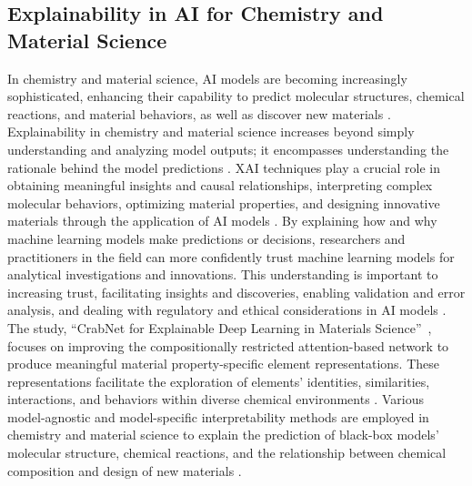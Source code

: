 \documentclass[final,5p,times,twocolumn]{elsarticle}
\begin{document}
\subsection{Explainability in AI for Chemistry and Material Science}
In chemistry and material science, AI models are becoming increasingly sophisticated, enhancing their capability to predict molecular structures, chemical reactions, and material behaviors, as well as discover new materials \cite{maqsood2024future}. Explainability in chemistry and material science increases beyond simply understanding and analyzing model outputs; it encompasses understanding the rationale behind the model predictions \cite{oviedo2022interpretable}. XAI techniques play a crucial role in obtaining meaningful insights and causal relationships, interpreting complex molecular behaviors, optimizing material properties, and designing innovative materials through the application of AI models \cite{pilania2021machine}. By explaining how and why machine learning models make predictions or decisions, researchers and practitioners in the field can more confidently trust machine learning models for analytical investigations and innovations.  This understanding is important to increasing trust, facilitating insights and discoveries, enabling validation and error analysis, and dealing with regulatory and ethical considerations in AI models \cite{choudhary2022recent}.  The study, ``CrabNet for Explainable Deep Learning in Materials Science''~\cite{wang2022crabnet}, focuses on improving the compositionally restricted attention-based network to produce meaningful material property-specific element representations. These representations facilitate the exploration of elements' identities, similarities, interactions, and behaviors within diverse chemical environments \cite{wang2022crabnet}. Various model-agnostic and model-specific interpretability methods are employed in chemistry and material science to explain the prediction of black-box models' molecular structure, chemical reactions, and the relationship between chemical composition \cite{lee2022comparison, feng2020explainable, harren2022interpretation} and design of new materials \cite{pilania2021machine}. 
\end{document}
